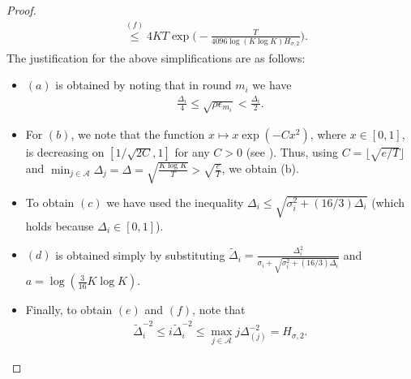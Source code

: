 \begin{proof}
\begin{align*}
& \overset{(f)}{\le}4KT \exp\bigg(- \frac{T}{4096 \log(K\log K)H_{\sigma,2}}\bigg).
\end{align*}
The justification for the above simplifications are as follows:
\begin{itemize}
\item $(a)$ is obtained by noting that in round $m_i$ we have 
\begin{align*}\frac{\Delta_i}{4}\leq\sqrt{\rho\epsilon_{m_{i}}}<\frac{\Delta_i}{2}.\end{align*}
\item For $(b)$, we note that the function $x\mapsto x\exp(-Cx^2)$, where $x\in[0,1]$, is  decreasing on $[1/\sqrt{2C},1]$ for any $C>0$ (see \cite{bubeck2011pure,auer2010ucb}). Thus, using $C=\lfloor \sqrt{e/T}\rfloor$ and $\min_{j\in \mathcal{A}}\Delta_j =\Delta =\sqrt{\frac{K\log K}{T}} > \sqrt{\frac{e}{T}}$,
we obtain (b).
\item To obtain $(c)$ we have used the inequality $\Delta_i\le \sqrt{\sigma_{i}^{2} + (16/3)\Delta_{i}}$ (which holds because $\Delta_i\in[0,1]$).
\item $(d)$ is obtained simply by substituting $\tilde{\Delta}_i=\frac{\Delta_{i}^{2}}{\sigma_{i}+\sqrt{\sigma_{i}^{2}+(16/3)\Delta_{i}}}$ and $a=\log(\frac{3}{16} K\log K)$.
\item Finally, to obtain $(e)$ and $(f)$, note that 
\begin{align*}
\tilde{\Delta}_i^{-2}\le i\tilde{\Delta}_i^{-2} \le \max_{j\in\mathcal{A}}j\Delta_{(j)}^{-2}=H_{\sigma,2}.
\end{align*}
\end{itemize}
\end{proof}

  

